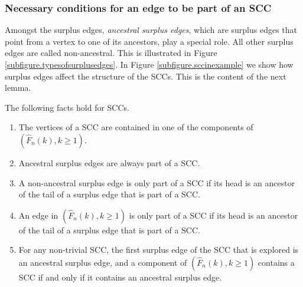 \subsubsection{Necessary conditions for an edge to be part of an SCC}\label{subsubsec.defcandidates}
Amongst the surplus edges, \emph{ancestral surplus edges}, which are surplus edges that point from a vertex to one of its ancestors, play a special role. All other surplus edges are called non-ancestral. This is illustrated in Figure \ref{subfigure.typesofsurplusedges}. In Figure \ref{subfigure.sccinexample} we show how surplus edges affect the structure of the SCCs. This is the content of the next lemma.
\begin{lemma}\label{lemma.whatispartofscc}
The following facts hold for SCCs. 
\begin{enumerate}
\item \label{item.factsonsccs1}The vertices of a SCC are contained in one of the components of {$(\hat{F}_n(k),k\geq 1)$}. 
\item \label{item.factsonsccs2} Ancestral surplus edges are always part of a SCC.
\item \label{item.factsonsccs4} A non-ancestral surplus edge is only part of a SCC if its head is an ancestor of the tail of a surplus edge that is part of a SCC.
\item \label{item.factsonsccs4andabit} An edge in $(\hat{F}_n(k),k\geq 1)$ is only part of a SCC if its head is an ancestor of the tail of a surplus edge that is part of a SCC.
\item \label{item.factsonsccs5} For any non-trivial SCC, the first surplus edge of the SCC that is explored is an ancestral surplus edge, and a component of  $(\hat{F}_n(k),k\geq 1)$ contains a SCC if and only if it contains an ancestral surplus edge.
\end{enumerate}
\end{lemma}
